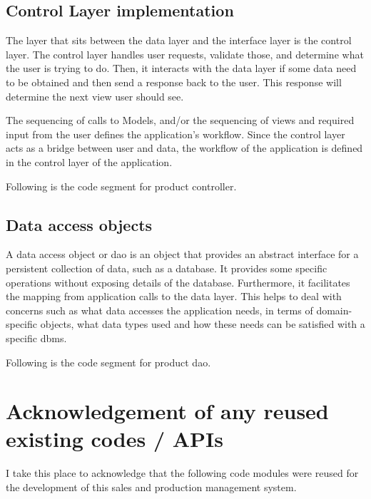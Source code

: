 \documentclass[12pt]{report}
\begin{document}


\subsection{Control Layer implementation}
The layer that sits between the data layer and the interface layer is the control layer. The control layer handles user requests, validate those, and determine what the user is trying to do. Then, it interacts with the data layer if some data need to be obtained and then send a response back to the user. This response will determine the next view user should see.

The sequencing of calls to Models, and/or the sequencing of views and required input from the user defines the application's workflow. Since the control layer acts as a bridge between user and data, the workflow of the application is defined in the control layer of the application.

\noindent
Following is the code segment for product controller.



\subsection{Data access objects}
A data access object or \acrshort{dao} is an object that provides an abstract interface for a persistent collection of data, such as a database. It provides some specific operations without exposing details of the database. Furthermore, it facilitates the mapping from application calls to the data layer. This helps to deal with concerns such as what data accesses the application needs, in terms of domain-specific objects, what data types used and how these needs can be satisfied with a specific \acrshort{dbms}.

\noindent
Following is the code segment for product dao.



\newpage
\section{Acknowledgement of any reused existing codes / APIs}
I take this place to acknowledge that the following code modules were reused for the development of this sales and production management system.
\end{document}
